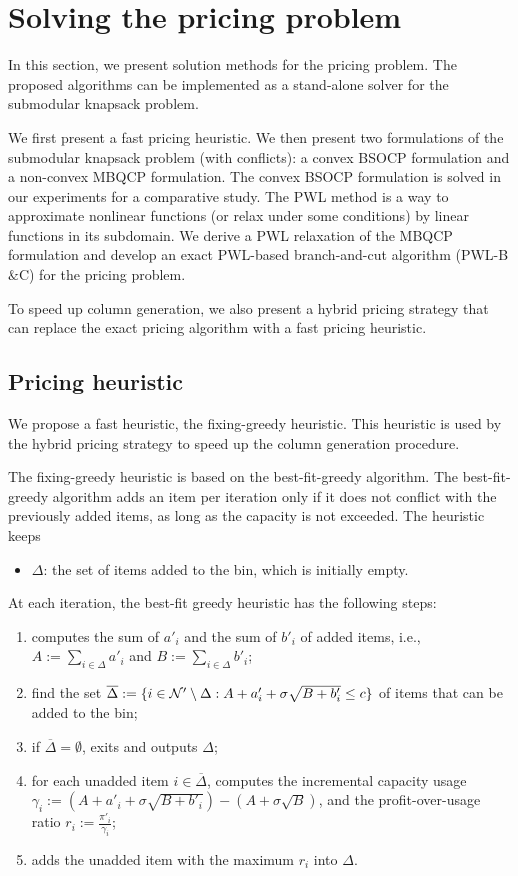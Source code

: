 \section{Solving the pricing problem}
\label{sec.price}
In this section, we present solution methods for the pricing problem. The proposed algorithms can be implemented as a stand-alone solver for the submodular knapsack problem.

We first present a fast pricing heuristic. We then present two formulations of the submodular knapsack problem (with conflicts): a convex BSOCP formulation and a non-convex MBQCP formulation. The convex BSOCP formulation is solved in our experiments for a comparative study. The PWL method is a way to approximate nonlinear functions (or relax under some conditions) by linear functions in its subdomain. We derive a PWL relaxation of the MBQCP formulation and develop an exact PWL-based branch-and-cut algorithm (PWL-B$\&$C) for the pricing problem.

To speed up column generation, we also present a hybrid pricing strategy  that can replace the exact pricing algorithm with a fast pricing heuristic.

\subsection{Pricing heuristic}
\label{sec.heur}

We propose a fast heuristic, the fixing-greedy heuristic. This heuristic is used by the hybrid pricing strategy to speed up the column generation procedure.

The fixing-greedy heuristic is based on the best-fit-greedy algorithm. The best-fit-greedy algorithm adds an item per iteration only if it does not conflict with the previously added items, as long as the capacity is not exceeded. The heuristic keeps
\begin{itemize}
    \item $\Delta$:   the set of items added to the bin, which is initially empty.
\end{itemize}

 At each iteration, the best-fit greedy heuristic has the following steps:

\begin{enumerate}
    \item computes the sum of \(a'_i\) and  the sum of
\(b'_i\) of added items, i.e.,  \(A := \sum_{i \in \Delta} a'_i\) and \(B := \sum_{i \in \Delta} b'_i\);
\item find the set $\overline{\Delta}:=\{i \in \mathcal N' \setminus \Delta: A + a'_i + \sigma \sqrt{B + b'_i} \le c\}$ of items that can be added to the bin;
\item if $\overline{\Delta} = \emptyset$, exits and outputs $\Delta$;
\item for each unadded item \(i \in \overline{\Delta}\), computes  the incremental capacity usage \(\gamma_i :=(A + a'_i + \sigma \sqrt{B + b'_i}) -(A + \sigma \sqrt{B})\), and the profit-over-usage ratio \(r_i := \frac{\pi'_i}{\gamma_i}\);
\item adds the unadded item with the maximum \(r_i\) into $\Delta$.
\end{enumerate}

